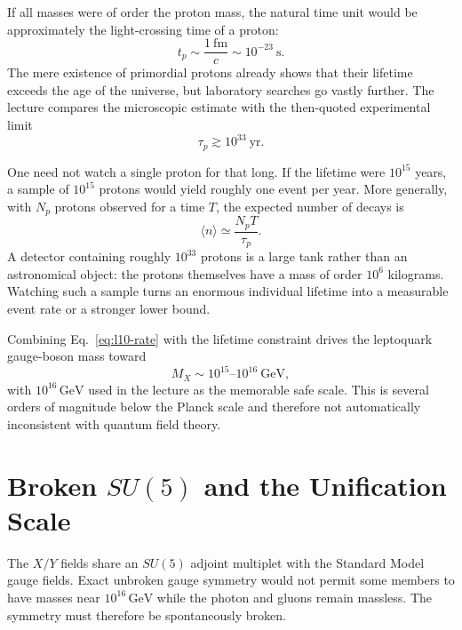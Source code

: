 If all masses were of order the proton mass, the natural time unit would be approximately the light-crossing time of a proton:
\begin{equation}
t_p\sim\frac{1\ \mathrm{fm}}{c}\sim10^{-23}\ \mathrm{s}.
\label{eq:l10-proton-time}
\end{equation}
The mere existence of primordial protons already shows that their lifetime exceeds the age of the universe, but laboratory searches go vastly further. The lecture compares the microscopic estimate with the then-quoted experimental limit
\begin{equation}
\tau_p\gtrsim10^{33}\ \mathrm{yr}.
\label{eq:l10-lifetime-bound}
\end{equation}

One need not watch a single proton for that long. If the lifetime were \(10^{15}\) years, a sample of \(10^{15}\) protons would yield roughly one event per year. More generally, with \(N_p\) protons observed for a time \(T\), the expected number of decays is
\begin{equation}
\langle n\rangle\simeq\frac{N_pT}{\tau_p}.
\label{eq:l10-event-count}
\end{equation}
A detector containing roughly \(10^{33}\) protons is a large tank rather than an astronomical object: the protons themselves have a mass of order \(10^6\) kilograms. Watching such a sample turns an enormous individual lifetime into a measurable event rate or a stronger lower bound.

Combining Eq.~\eqref{eq:l10-rate} with the lifetime constraint drives the leptoquark gauge-boson mass toward
\begin{equation}
M_X\sim10^{15}\text{--}10^{16}\ \mathrm{GeV},
\label{eq:l10-mx}
\end{equation}
with \(10^{16}\,\mathrm{GeV}\) used in the lecture as the memorable safe scale. This is several orders of magnitude below the Planck scale and therefore not automatically inconsistent with quantum field theory.

\section{Broken \texorpdfstring{\(SU(5)\)}{SU(5)} and the Unification Scale}

The \(X/Y\) fields share an \(SU(5)\) adjoint multiplet with the Standard Model gauge fields. Exact unbroken gauge symmetry would not permit some members to have masses near \(10^{16}\,\mathrm{GeV}\) while the photon and gluons remain massless. The symmetry must therefore be spontaneously broken.

